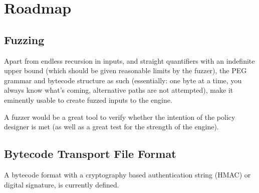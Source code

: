 \section{Roadmap}

\subsection{Fuzzing}

Apart from endless recursion in inputs, and straight quantifiers with
an indefinite upper bound (which should be given reasonable limits by
the fuzzer), the PEG grammar and bytecode structure as such (essentially:
one byte at a time, you always know what's coming, alternative paths are
not attempted), make it eminently usable to create fuzzed inputs to the engine.

A fuzzer would be a great tool to verify whether the intention of the
policy designer is met
(as well as a great test for the strength of the engine).

\subsection{Bytecode Transport File Format}

A bytecode format with a cryptography based authentication string (HMAC)
or digital signature, is currently defined.
